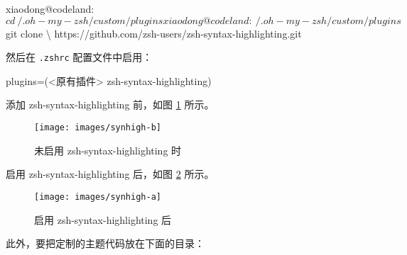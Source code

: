 \documentclass[]{ctexbook}
\newenvironment{Shaded}{\begin{snugshade}}{\end{snugshade}}
\newcommand{\DataTypeTok}[1]{\textcolor[rgb]{0.13,0.29,0.53}{#1}}
\newcommand{\ExtensionTok}[1]{#1}
\newcommand{\NormalTok}[1]{#1}
\newcommand{\StringTok}[1]{\textcolor[rgb]{0.31,0.60,0.02}{#1}}
\newcommand{\VariableTok}[1]{\textcolor[rgb]{0.00,0.00,0.00}{#1}}
\begin{document}
\begin{Shaded}
\begin{Highlighting}[]
\ExtensionTok{xiaodong@codeland}\NormalTok{:~$ cd ~/.oh-my-zsh/custom/plugins}
\ExtensionTok{xiaodong@codeland}\NormalTok{:~/.oh-my-zsh/custom/plugins$ git clone \textbackslash{}}
\NormalTok{https://github.com/zsh-users/zsh-syntax-highlighting.git}
\end{Highlighting}
\end{Shaded}

然后在 \texttt{.zshrc} 配置文件中启用：

\begin{Shaded}
\begin{Highlighting}[]
\VariableTok{plugins=(}\NormalTok{<原有插件> zsh-syntax-highlighting}\VariableTok{)}
\end{Highlighting}
\end{Shaded}

添加 zsh-syntax-highlighting 前，如图 \ref{fig:synhigh-b} 所示。

\begin{Shaded}
\end{Shaded}

\begin{figure}
\texttt{[image: images/synhigh-b]} \caption{未启用 zsh-syntax-highlighting 时}\label{fig:synhigh-b}
\end{figure}

启用 zsh-syntax-highlighting 后，如图 \ref{fig:synhigh-a} 所示。

\begin{Shaded}
\end{Shaded}

\begin{figure}
\texttt{[image: images/synhigh-a]} \caption{启用 zsh-syntax-highlighting 后}\label{fig:synhigh-a}
\end{figure}

此外，要把定制的主题代码放在下面的目录：
\end{document}
